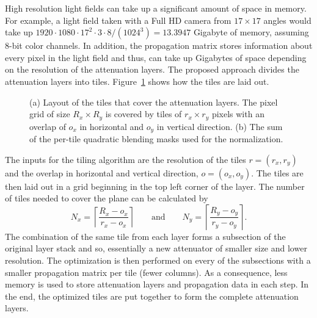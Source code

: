 High resolution light fields can take up a significant amount of space in memory. 
For example, a light field taken with a Full HD camera from $17 \times 17$ angles would take up $1920 \cdot 1080 \cdot 17^2 \cdot 3 \cdot 8 / (1024^3) = 13.3947$ Gigabyte of memory, assuming \mbox{8-bit} color channels. 
In addition, the propagation matrix stores information about every pixel in the light field and thus, can take up Gigabytes of space depending on the resolution of the attenuation layers. 
The proposed approach divides the attenuation layers into tiles. 
Figure~\ref{fig:tiling_layout} shows how the tiles are laid out.
\begin{figure}[tb]
	\begin{subfigure}{0.5\textwidth}
		\centering
		
		\caption{}
		\label{fig:tiling_layout}
	\end{subfigure}%
	\begin{subfigure}{0.5\textwidth}
		\centering
		
		\caption{}
		\label{fig:sum_of_quadratic_blending_masks}
	\end{subfigure}%
	\caption[Tiling layout]
			{(a) Layout of the tiles that cover the attenuation layers.
				 The pixel grid of size $R_x \times R_y$ is covered by tiles of $r_x \times r_y$ pixels with an overlap of $o_x$ in horizontal and $o_y$ in vertical direction.
			 (b) The sum of the per-tile quadratic blending masks used for the normalization.}
\end{figure} 
The inputs for the tiling algorithm are the resolution of the tiles $r = (r_x, r_y)$ and the overlap in horizontal and vertical direction, $o = (o_x, o_y)$. 
The tiles are then laid out in a grid beginning in the top left corner of the layer. 
The number of tiles needed to cover the plane can be calculated by 
\begin{equation}
	N_x = \left \lceil \dfrac{R_x - o_x}{r_x - o_x} \right \rceil
	\qquad 
	\text{and} 
	\qquad
	N_y = \left \lceil \dfrac{R_y - o_y}{r_y - o_y} \right \rceil.
\end{equation}
The combination of the same tile from each layer forms a subsection of the original layer stack and so, essentially a new attenuator of smaller size and lower resolution.
The optimization is then performed on every of the subsections with a smaller propagation matrix per tile (fewer columns). 
As a consequence, less memory is used to store attenuation layers and propagation data in each step.
In the end, the optimized tiles are put together to form the complete attenuation layers. 

